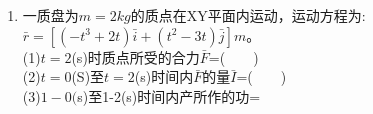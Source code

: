 \begin{enumerate}
\item 一质盘为$m=2kg$的质点在XY平面内运动，运动方程为:$\bar r =[(-t^3+2t)\bar i+(t^2-3t)\bar j]m$。\\
(1)$t=2$(s)时质点所受的合力$\bar F$=($\qquad$)\\
(2)$t=0$(S)至$t=2$(s)时间内$\bar F$的量$\bar I$=($\qquad$)\\
(3)$1-0($s)至1-2(s)时间内产所作的功=
\end{enumerate}
